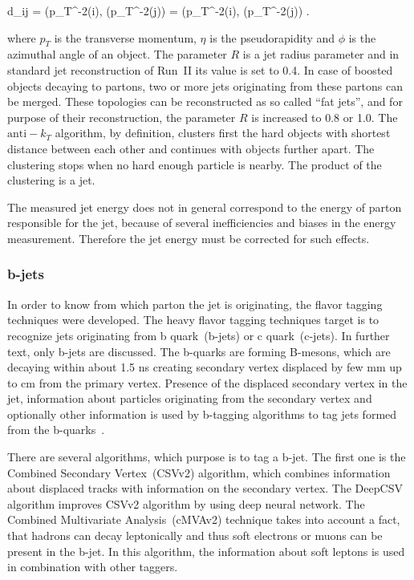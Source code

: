 {   
    d_{ij} = (p_{T}^{-2}(i), (p_{T}^{-2}(j))  =  (p_{T}^{-2}(i), (p_{T}^{-2}(j)) .
}

where $p_{T}$ is the transverse momentum, $\eta$ is the pseudorapidity and $\phi$ is the azimuthal angle of an object. The parameter $R$ is a jet radius parameter and in standard jet reconstruction of Run~II its value is set to 0.4. In case of boosted objects decaying to partons, two or more jets originating from these partons can be merged. These topologies can be reconstructed as so called ``fat jets'', and for purpose of their reconstruction, the parameter $R$ is increased to 0.8 or 1.0. The $\mathrm{anti-}k_{T}$ algorithm, by definition, clusters first the hard objects with shortest distance between each other and continues with objects further apart. The clustering stops when no hard enough particle is nearby. The product of the clustering is a jet.

The measured jet energy does not in general correspond to the energy of parton responsible for the jet, because of several inefficiencies and biases in the energy measurement. Therefore the jet energy must be corrected for such effects.

\subsubsection{b-jets}

In order to know from which parton the jet is originating, the flavor tagging techniques were developed. The heavy flavor tagging techniques target is to recognize jets originating from b quark~(b-jets) or c quark~(c-jets). In further text, only b-jets are discussed. The b-quarks are forming B-mesons, which are decaying within about 1.5 ns creating secondary vertex displaced by few mm up to cm from the primary vertex. Presence of the displaced secondary vertex in the jet, information about particles originating from the secondary vertex and optionally other information is used by b-tagging algorithms to tag jets formed from the b-quarks~\cite{Sirunyan:2017ezt}.

There are several algorithms, which purpose is to tag a b-jet. The first one is the Combined Secondary Vertex~(CSVv2) algorithm, which combines information about displaced tracks with information on the secondary vertex. The DeepCSV algorithm improves CSVv2 algorithm by using deep neural network. The Combined Multivariate Analysis~(cMVAv2) technique takes into account a fact, that hadrons can decay leptonically and thus soft electrons or muons can be present in the b-jet. In this algorithm, the information about soft leptons is used in combination with other taggers.

